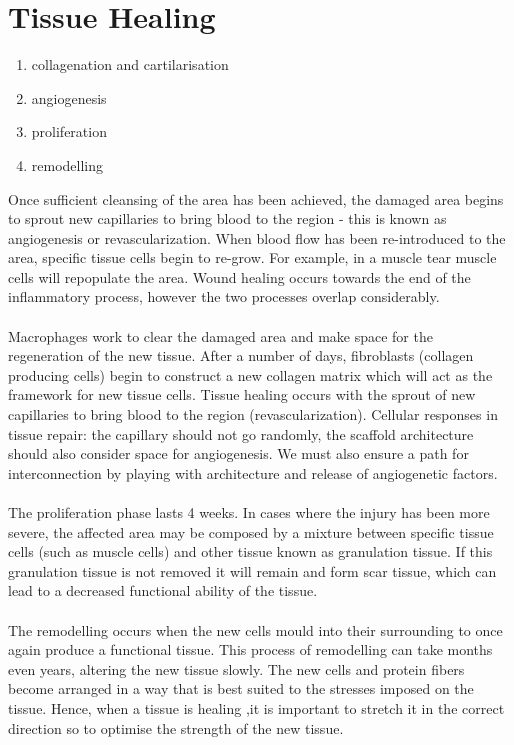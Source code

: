 \section{Tissue Healing}
\begin{enumerate}
\item collagenation and cartilarisation
\item angiogenesis
\item proliferation
\item remodelling
\end{enumerate}
\noindent
Once sufficient cleansing of the area has been achieved, the damaged area begins to sprout new capillaries to bring blood to the region - this is known as angiogenesis or revascularization.
When blood flow has been re-introduced to the area, specific tissue cells begin to re-grow.
For example, in a muscle tear muscle cells will repopulate the area.
Wound healing occurs towards the end of the inflammatory process, however the two processes overlap considerably.
\\
\\
\noindent
Macrophages work to clear the damaged area and make space for the regeneration of the new tissue.
After a number of days, fibroblasts (collagen producing cells) begin to construct a new collagen matrix which will act as the framework for new tissue cells.
Tissue healing occurs with the sprout of new capillaries to bring blood to the region (revascularization).
Cellular responses in tissue repair: the capillary should not go randomly, the scaffold architecture should also consider space for angiogenesis.
 We must also ensure a path for interconnection by playing with architecture and release of angiogenetic factors.
\\
\\
\noindent
The proliferation phase lasts 4 weeks.
In cases where the injury has been more severe, the affected area may be composed by a mixture between specific tissue cells (such as muscle cells) and other tissue known as granulation tissue.
If this granulation tissue is not removed it will remain and form scar tissue, which can lead to a decreased functional ability of the tissue.
\\
\\
\noindent
The remodelling occurs when the new cells mould into their surrounding to once again produce a functional tissue.
This process of remodelling can take months even years, altering the new tissue slowly.
The new cells and protein fibers become arranged in a way that is best suited to the stresses imposed on the tissue.
Hence, when a tissue is healing ,it is important to stretch it in the correct direction so to optimise the strength of the new tissue.


